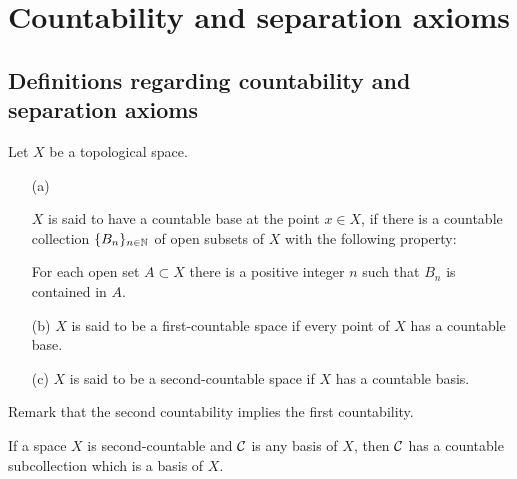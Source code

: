 \section{Countability and separation axioms}

\subsection{Definitions regarding countability and separation axioms}
\begin{defi}
    Let $X$ be a topological space.
    \begin{enumerate}
        \item[(a)]
        {
            $X$ is said to have a countable base at the point $x\in X$, if there is a countable collection $\{B_n\}_{n\in{\mathbb{N}}}$ of open subsets of $X$ with the following property:
            \begin{center}
                For each open set $A\subset X$ there is a positive integer $n$ such that $B_n$ is contained in $A$.
            \end{center}
        }
        \item[(b)]
        {
            $X$ is said to be a first-countable space if every point of $X$ has a countable base.
        }
        \item[(c)]
        {
            $X$ is said to be a second-countable space if $X$ has a countable basis.
        }
    \end{enumerate}
    Remark that the second countability implies the first countability.
\end{defi}
\begin{rmk}
    If a space $X$ is second-countable and ${\mathcal{C}}$ is any basis of $X$, then ${\mathcal{C}}$ has a countable subcollection which is a basis of $X$.
\end{rmk}
